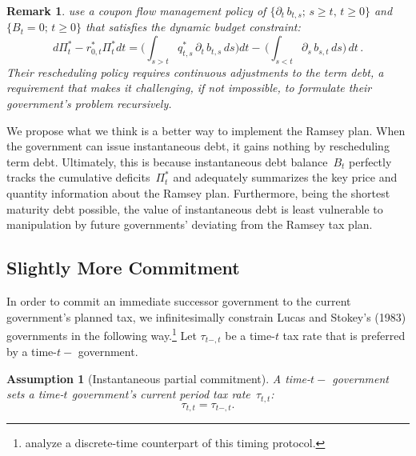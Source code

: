 \documentclass[12pt]{article}
\newtheorem{remark}[theorem]{Remark}
\newtheorem{assumption}{Assumption}
\newcommand{\NW}[1]{{\textcolor{blue}{#1}}}
\begin{document}
{\begin{remark}\label{rmk:LS_comparison}
\cite{LucasStokey1983} use a coupon flow management policy of $\{\partial_t\, b_{t,s};\, s \ge t,\, t \ge 0\}$ and $\{B_t = 0;\, t \ge 0\}$ that satisfies the dynamic budget constraint:
	\begin{equation}\label{eq:dPi_LS}
	d\Pi_t^* -r_{0, t}^*\Pi_t^*dt =  {\biggl(\int_{s > t} q_{t,s}^*\, \partial_t\, b_{t,s}\, ds\biggr) dt}%
	-\, %
	{\biggl( \int_{s<t}\partial_s\, b_{s,t}\, ds\biggr)  \, dt}\, . 
	\end{equation}
	Their rescheduling policy requires  continuous adjustments to the term debt, a requirement that makes it challenging, if not impossible,  to formulate their government's problem recursively.
\end{remark}

We propose what we think is  a better way to implement the Ramsey plan. When the government can issue  instantaneous debt, it gains nothing by rescheduling term debt.  Ultimately, this is  because instantaneous debt balance~$B_t$ perfectly tracks the cumulative deficits~$\Pi_t^*$ and adequately  summarizes the key  price and quantity information about the Ramsey plan. Furthermore, being  the shortest maturity debt possible, the value of   instantaneous debt  is least vulnerable to manipulation by future governments' deviating from the Ramsey tax plan.


\subsection{Slightly More  Commitment}\label{subsec:timingprot}
In order to  commit an immediate successor government to  the current government's planned  tax, 
we infinitesimally constrain  Lucas and Stokey's (1983)   governments in the following way.\footnote{\cite*{JiangSargentWang2025} analyze a  discrete-time counterpart of this timing protocol.} %
Let  $\tau_{t-,t}$ be a time-$t$ tax rate that is preferred by a time-$t-$ government.
\begin{assumption}[Instantaneous partial commitment]\label{ass:timing}
	{A  time-$t-$} government sets a {time-$t$ government's current period tax rate~$\tau_{t,t}$:} %
	\begin{equation}\label{eq:timing}
	\tau_{t,t} = \tau_{t-,t}.
	\end{equation}
	

\end{assumption}}
\end{document}
